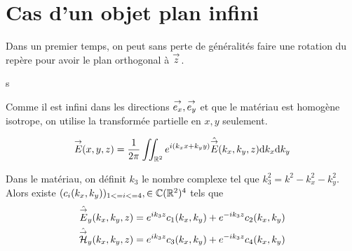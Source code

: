 \section{Cas d'un objet plan infini}

    Dans un premier temps, on peut sans perte de généralités faire une rotation du repère pour avoir le plan orthogonal à \(\vect{z}\).

    \begin{figure}[!h]
        \begin{center}
            \begin{tikzpicture}
                
            \end{tikzpicture}
        \end{center}
    \end{figure}s

    Comme il est infini dans les directions \(\vect{e_x} ,\vect{e_y}\) et que le matériau est homogène isotrope, on utilise la transformée partielle en \(x, y\) seulement.

    \begin{equation}
        \vE(x,y,z) = \frac{1}{2\pi}\iint_{\RR^2} e^{i(k_x x + k_y y)}\hat{\vE} (k_x,k_y,z) \dd{k_x}\dd{k_y}
    \end{equation}

    \begin{prop}
        Dans le matériau, on définit \(k_3\) le nombre complexe tel que \(k_3^2 = k^2 - k_x^2 - k_y^2\).
        Alors existe \((c_i(k_x,k_y))_{1<=i<=4}, \in \CC(\RR^2)^4\) tels que
        \begin{subequations}
            \begin{align}
                \hat{\vE}_y(k_x,k_y,z) & = e^{ik_3z}c_1(k_x,k_y) + e^{-ik_3z}c_2(k_x,k_y)
                \\
                \hat{\vH}_y(k_x,k_y,z) & = e^{ik_3z}c_3(k_x,k_y) + e^{-ik_3z}c_4(k_x,k_y)
            \end{align}
        \end{subequations}
    \end{prop}

